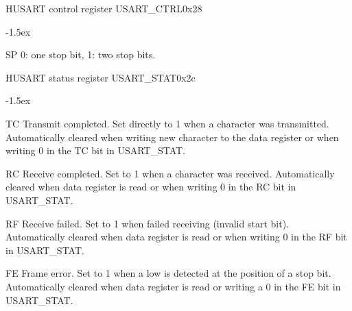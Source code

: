 \documentclass[12pt]{article}
\begin{document}
\begin{register}{H}{USART control register USART\_CTRL}{0x28}
\label{usartctrl}
%
\regnewline%
\end{register}
\begin{regdesc}[0.6\textwidth]\begin{reglist}[00000]
\itemsep-1.5ex
\item[SP] 0: one stop bit, 1: two stop bits.
\end{reglist}\end{regdesc}


\begin{register}{H}{USART status register USART\_STAT}{0x2c}
\label{usartstat}
%
%
%
%
%
%
\regnewline%
\end{register}
\begin{regdesc}[0.8\textwidth]\begin{reglist}[0000]
\itemsep-1.5ex
\item[TC] Transmit completed. Set directly to 1 when a character was transmitted. Automatically cleared when writing new character to the data register or when writing 0 in the TC bit in USART\_STAT.
\item[RC] Receive completed. Set to 1 when a character was received. Automatically cleared when data register is read or when writing 0 in the RC bit in USART\_STAT.
\item[RF] Receive failed. Set to 1 when failed receiving (invalid start bit). Automatically cleared when data register is read or when writing 0 in the RF bit in USART\_STAT.
\item [FE] Frame error. Set to 1 when a low is detected at the position of a stop bit. Automatically cleared when data register is read or writing a 0 in the FE bit in USART\_STAT.
\end{reglist}\end{regdesc}

%

%
\end{document}
